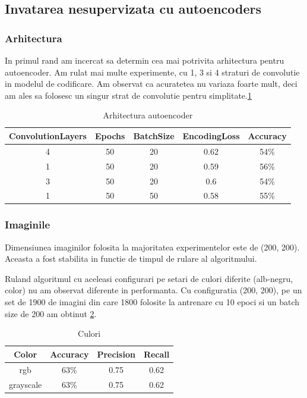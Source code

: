\documentclass{article}
\begin{document}
\subsection{Invatarea nesupervizata cu autoencoders}

\subsubsection{Arhitectura}
In primul rand am incercat sa determin cea mai potrivita arhitectura pentru autoencoder. Am rulat mai multe experimente, cu 1, 3 si 4 straturi de convolutie in modelul de codificare. Am observat ca acuratetea nu variaza foarte mult, deci am ales sa folosesc un singur strat de convolutie pentru simplitate.\ref{tab:arh}

\begin{table}[h!]
  \begin{center}
    \caption{Arhitectura autoencoder}
    \label{tab:arh}
    \begin{tabular}{c|c|c|c|c}
      \textbf{ConvolutionLayers} & \textbf{Epochs} & \textbf{BatchSize} & \textbf{EncodingLoss} & \textbf{Accuracy}\\
      \hline
      4 & 50 & 20 & 0.62 & 54\% \\
      1 & 50 & 20 & 0.59 & 56\% \\
      3 & 50 & 20 & 0.6 & 54\%  \\
      1 & 50 & 50 & 0.58 & 55\% \\
      \end{tabular}
  \end{center}
\end{table}

\subsubsection{Imaginile}
Dimensiunea imaginilor folosita la majoritatea experimentelor este de (200, 200). Aceasta a fost stabilita in functie de timpul de rulare al algoritmului. 

Ruland algoritmul cu aceleasi configurari pe setari de culori diferite (alb-negru, color) nu am observat diferente in performanta.
Cu configuratia (200, 200), pe un set de 1900 de imagini din care 1800 folosite la antrenare cu 10 epoci si un batch size de 200 am obtinut \ref{tab:resColor}.
\begin{table}[h!]
 
  \begin{center}
    \caption{Culori}
    \label{tab:resColor}
    \begin{tabular}{c|c|c|c}
      \textbf{Color} & \textbf{Accuracy} & \textbf{Precision} & \textbf{Recall} \\
      \hline
      rgb & 63\% & 0.75  & 0.62 \\
      grayscale & 63\% & 0.75 & 0.62 \\
      \end{tabular}
  \end{center}
\end{table}
\end{document}
